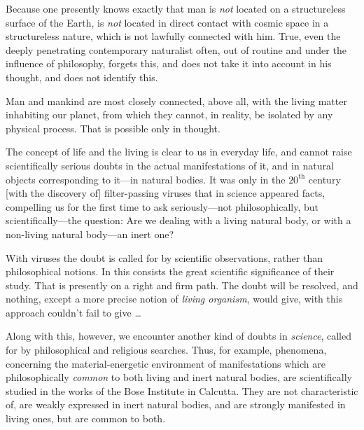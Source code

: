 Because one presently knows exactly that man is \emph{not} located on a
structureless surface of the Earth, is \emph{not} located in direct contact
with cosmic space in a structureless nature, which is not lawfully connected
with him.  True, even the deeply penetrating contemporary naturalist often, out
of routine and under the influence of philosophy, forgets this, and does not
take it into account in his thought, and does not identify this.

Man and mankind are most closely connected, above all, with the living matter
inhabiting our planet, from which they cannot, in reality, be isolated by any
physical process.  That is possible only in thought.


\Section %
The concept of life and the living is clear to us in everyday life, and cannot
raise scientifically serious doubts in the actual manifestations of it, and in
natural objects corresponding to it---in natural bodies.  It was only in the
$20^{\mathrm{th}}$ century [with the discovery of] filter-passing viruses that
in science appeared facts, compelling us for the first time to ask
seriously---not philosophically, but scientifically---the question: Are we
dealing with a living natural body, or with a non-living natural body---an
inert one?

With viruses the doubt is called for by scientific observations, rather than
philosophical notions.  In this consists the great scientific significance of
their study.  That is presently on a right and firm path.  The doubt will be
resolved, and nothing, except a more precise notion of \emph{living organism},
would give, with this approach couldn't fail to give \dots

Along with this, however, we encounter another kind of doubts in
\emph{science}, called for by philosophical and religious searches.  Thus, for
example, phenomena, concerning the material-energetic environment of
manifestations which are philosophically \emph{common} to both living and inert
natural bodies, are scientifically studied in the works of the Bose Institute
in Calcutta. They are not characteristic of, are weakly expressed in inert natural bodies,
and are strongly manifested in living ones, but are common to both.

